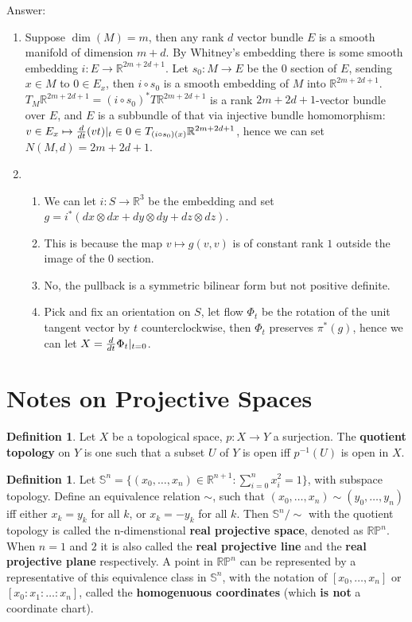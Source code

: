 \documentclass{article}
\theoremstyle{definition}
\newtheorem{dfn}[thm]{Definition}
\begin{document}
Answer:
\begin{enumerate}
    \item Suppose $\dim(M)=m$, then any rank $d$ vector bundle $E$ is a smooth manifold of dimension $m+d$. By Whitney's embedding there is some smooth embedding $i: E\rightarrow\mathbb{R}^{2m+2d+1}$. Let $s_0: M\rightarrow E$ be the $0$ section of $E$, sending $x\in M$ to $0\in E_x$, then $i\circ s_0$ is a smooth embedding of $M$ into $\mathbb{R}^{2m+2d+1}$. $T_M\mathbb{R}^{2m+2d+1}=(i\circ s_0)^*T\mathbb{R}^{2m+2d+1}$ is a rank $2m+2d+1$-vector bundle over $E$, and $E$ is a subbundle of that via injective bundle homomorphism: $v\in E_x\mapsto {d\over dt}(vt)|_t\in 0\in T_{(i\circ s_0)(x)}\mathbb{R}^{2m+2d+1}$, hence we can set $N(M, d)=2m+2d+1$.
    \item \begin{enumerate}[(1)]
        \item We can let $i: S\rightarrow \mathbb{R}^3$ be the embedding and set $g=i^*(dx\otimes dx+dy\otimes dy+dz\otimes dz)$.
        \item This is because the map $v\mapsto g(v, v)$ is of constant rank $1$ outside the image of the $0$ section.
        \item No, the pullback is a symmetric bilinear form but not positive definite.
        \item Pick and fix an orientation on $S$, let flow $\Phi_t$ be the rotation of the unit tangent vector by $t$ counterclockwise, then $\Phi_t$ preserves $\pi^*(g)$, hence we can let $X={d\over dt}\Phi_t|_{t=0}$.
    \end{enumerate}
\end{enumerate}

\newpage

\section{Notes on Projective Spaces}

\begin{dfn}
    Let $X$ be a topological space, $p: X\rightarrow Y$ a surjection. The {\bf quotient topology} on $Y$ is one such that a subset $U$ of $Y$ is open iff $p^{-1}(U)$ is open in $X$.
\end{dfn}

\begin{dfn}
    Let $\mathbb{S}^n=\{(x_0, \dots, x_n)\in\mathbb{R}^{n+1}: \sum_{i=0}^n x_i^2=1\}$, with subspace topology. Define an equivalence relation $\sim$, such that $(x_0, \dots, x_n)\sim (y_0, \dots, y_n)$ iff either $x_k=y_k$ for all $k$, or $x_k=-y_k$ for all $k$. Then $\mathbb{S}^n/\sim$ with the quotient topology is called the n-dimenstional {\bf real projective space}, denoted as $\mathbb{RP}^n$. When $n=1$ and $2$ it is also called the {\bf real projective line} and the {\bf real projective plane} respectively. A point in $\mathbb{RP}^n$ can be represented by a representative of this equivalence class in $\mathbb{S}^n$, with the notation of $[x_0, \dots, x_n]$ or $[x_0:x_1:\dots:x_n]$, called the {\bf homogenuous coordinates} (which {\bf is not} a coordinate chart). 
\end{dfn}
\end{document}
